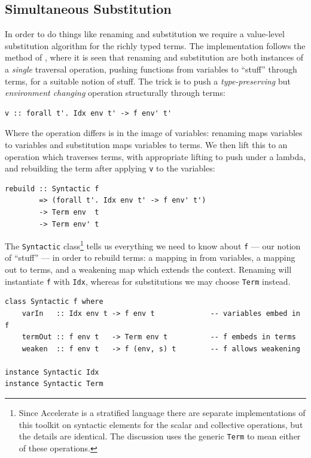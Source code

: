 \subsection{Simultaneous Substitution}
\label{sec:substitution}

In order to do things like renaming and substitution we require a value-level
substitution algorithm for the richly typed terms. The implementation follows
the method of \citet{McBride:2006,McBride:2005}, where it is seen that renaming
and substitution are both instances of a \emph{single} traversal operation,
pushing functions from variables to ``stuff'' through terms, for a suitable
notion of stuff.
%
The trick is to push a \emph{type-preserving} but \emph{environment changing}
operation structurally through terms:
%
\begin{lstlisting}[style=haskell]
v :: forall t'. Idx env t' -> f env' t'
\end{lstlisting}

Where the operation differs is in the image of variables: renaming maps
variables to variables and substitution maps variables to terms. We then lift
this to an operation which traverses terms, with appropriate lifting to push
under a lambda, and rebuilding the term after applying \texttt{v} to the
variables:
%
\begin{lstlisting}[style=haskell]
rebuild :: Syntactic f
        => (forall t'. Idx env t' -> f env' t')
        -> Term env  t
        -> Term env' t
\end{lstlisting}

The \texttt{Syntactic} class\footnote{Since Accelerate is a stratified language
there are separate implementations of this toolkit on syntactic elements for the
scalar and collective operations, but the details are identical. The discussion
uses the generic \texttt{Term} to mean either of these operations.} tells us
everything we need to know about \texttt{f} --- our notion of ``stuff'' --- in
order to rebuild terms: a mapping in from variables, a mapping out to terms, and
a weakening map which extends the context. Renaming will instantiate \texttt{f}
with \texttt{Idx}, whereas for substitutions we may choose \texttt{Term}
instead.
%
\begin{lstlisting}[style=haskell]
class Syntactic f where
    varIn   :: Idx env t -> f env t             -- variables embed in f
    termOut :: f env t   -> Term env t          -- f embeds in terms
    weaken  :: f env t   -> f (env, s) t        -- f allows weakening

instance Syntactic Idx
instance Syntactic Term
\end{lstlisting}

